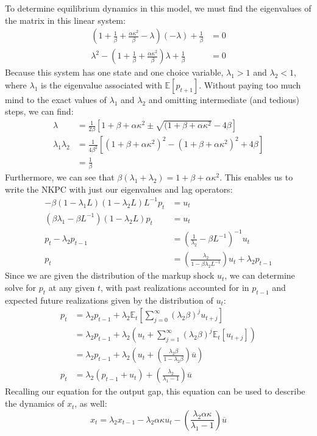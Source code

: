 \documentclass{article}
\newcommand{\E}[1]{\mathbb{E}\left[#1\right]} %
\newcommand{\Et}[1]{\mathbb{E}_t\left[#1\right]}
\begin{document}
To determine equilibrium dynamics in this model, we must find the eigenvalues of the matrix in this linear system:
\begin{align*}
	(1+\frac{1}{\beta}+\frac{\alpha\kappa^2}{\beta}-\lambda)(-\lambda) + \frac{1}{\beta}	&= 0	\\
	\lambda^2 - (1+\frac{1}{\beta}+\frac{\alpha\kappa^2}{\beta})\lambda + \frac{1}{\beta}	&= 0
\end{align*}
Because this system has one state and one choice variable, $\lambda_1>1$ and $\lambda_2<1$, where $\lambda_1$ is the eigenvalue associated with $\E{p_{t+1}}$. Without paying too much mind to the exact values of $\lambda_1$ and $\lambda_2$ and omitting intermediate (and tedious) steps, we can find:
\begin{align*}
	\lambda 			&= \frac{1}{2\beta}\left[1+\beta+\alpha\kappa^2 \pm \sqrt{(1+\beta+\alpha\kappa^2}-4\beta\right]	\\
	\lambda_1\lambda_2 	&= \frac{1}{4\beta^2}\left[(1+\beta+\alpha\kappa^2)^2 - (1+\beta+\alpha\kappa^2)^2 + 4\beta\right]	\\
						&= \frac{1}{\beta}
\end{align*}
Furthermore, we can see that ${\beta(\lambda_1 + \lambda_2) = 1+\beta+\alpha\kappa^2}$. This enables us to write the NKPC with just our eigenvalues and lag operators:
\begin{align*}
	-\beta(1-\lambda_1L)(1-\lambda_2L)L^{-1}p_t 				&= u_t																			\\
	\left(\beta\lambda_1-\beta L^{-1}\right)(1-\lambda_2L)p_t 	&= u_t																			\\
										p_t - \lambda_2p_{t-1}	&= \left(\frac{1}{\lambda_2}-\beta L^{-1}\right)^{-1}u_t 						\\
															p_t	&= \left(\frac{\lambda_2}{1-\beta\lambda_2L^{-1}}\right)u_t + \lambda_2p_{t-1}
\end{align*}
Since we are given the distribution of the markup shock $u_t$, we can determine solve for $p_t$ at any given $t$, with past realizations accounted for in $p_{t-1}$ and expected future realizations given by the distribution of $u_t$:
\begin{align*}
	p_t &= \lambda_2p_{t-1} + \lambda_2\Et{\sum_{j=0}^\infty(\lambda_2\beta)^ju_{t+j}}										\\
		&= \lambda_2p_{t-1} + \lambda_2\left(u_t + \sum_{j=1}^\infty(\lambda_2\beta)^j\Et{u_{t+j}}\right)					\\
		&= \lambda_2p_{t-1} + \lambda_2\left(u_t + \left(\frac{\lambda_2\beta}{1-\lambda_2\beta}\right)\overline{u}\right)	\\
	p_t &= \lambda_2(p_{t-1} + u_t) + \left(\frac{\lambda_2}{\lambda_1-1}\right)\overline{u}					
\end{align*}
Recalling our equation for the output gap, this equation can be used to describe the dynamics of $x_t$, as well:
\[
	x_t = \lambda_2x_{t-1} - \lambda_2\alpha\kappa u_t - \left(\frac{\lambda_2\alpha\kappa}{\lambda_1-1}\right)\overline{u}
\]
\end{document}
